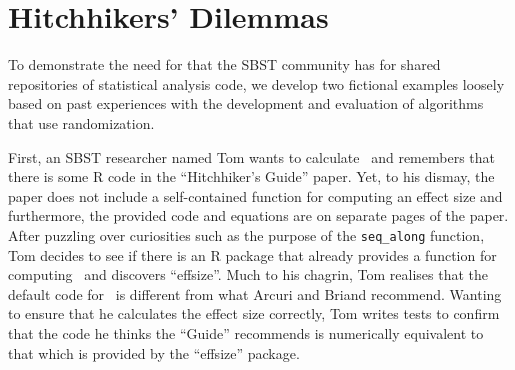 
\section{Hitchhikers' Dilemmas}
\label{sec:dilemma}

To demonstrate the need for that the SBST community has for shared repositories of statistical analysis code, we develop
two fictional examples loosely based on past experiences with the development and evaluation of algorithms that use
randomization.

First, an SBST researcher named Tom wants to calculate \atwelve~and remembers that there is some R code in the
``Hitchhiker's Guide'' paper. Yet, to his dismay, the paper does not include a self-contained function for computing an
effect size and furthermore, the provided code and equations are on separate pages of the paper. After puzzling over
curiosities such as the purpose of the {\tt seq\_along} function, Tom decides to see if there is an R package that
already provides a function for computing \atwelve~and discovers ``effsize''. Much to his chagrin, Tom realises that the
default code for \atwelve~is different from what Arcuri and Briand recommend. Wanting to ensure that he calculates the
effect size correctly, Tom writes tests to confirm that the code he thinks the ``Guide'' recommends is numerically
equivalent to that which is provided by the ``effsize'' package.


